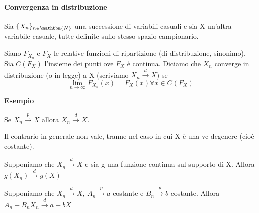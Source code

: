 \paragraph{Convergenza in distribuzione}
\begin{definizione}

Sia $\{X_n\}_{n\in\mathbbm{N}}$ una successione di variabili casuali e 
sia X un'altra variabile casuale, tutte definite sullo stesso spazio campionario.

Siano $F_{X_n}$ e $F_X$ le relative funzioni di ripartizione (di distribuzione, sinonimo).
Sia $C(F_X)$ l'insieme dei punti ove $F_X$ è continua. 
Diciamo che $X_n$ converge in distribuzione (o in legge) a X (scriviamo $X_n\stackrel{d}{\rightarrow}X$) se 
$$\lim_{n \rightarrow\infty} F_{X_n}(x)=F_X(x) \forall x \in C(F_X)$$
\end{definizione}
\textbf{Esempio}
\begin{teo}
Se $X_n\stackrel{p}{\rightarrow}X$ allora $X_n\stackrel{d}{\rightarrow}X$.
\end{teo}
\begin{oss}
Il contrario in generale non vale, tranne nel caso in cui X è una vc degenere (cioè costante).
\end{oss}
\begin{teo} Supponiamo che $X_n\stackrel{d}{\rightarrow}X$ e sia g una funzione continua sul supporto di X. Allora $g(X_n)\stackrel{d}{\rightarrow}g(X)$
\end{teo}
\begin{teo} [Slutsky] Supponiamo che $X_n\stackrel{d}{\rightarrow}X$, $A_n\stackrel{p}{\rightarrow}a$ costante e $B_n\stackrel{p}{\rightarrow}b$ costante. Allora $A_n+B_n X_n\stackrel{d}{\rightarrow}a+bX$
\end{teo}
